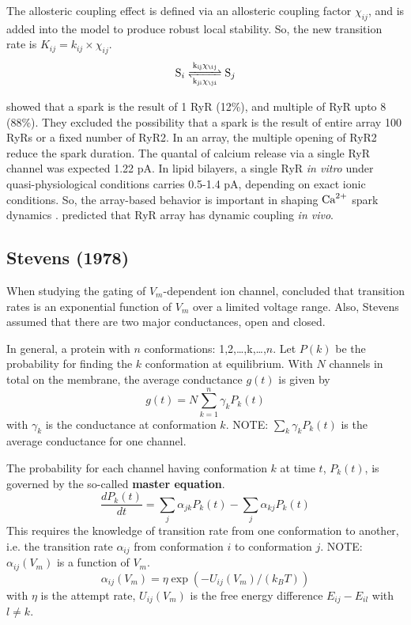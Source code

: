 The allosteric coupling effect is defined via an allosteric coupling
factor $\chi_{ij}$, and is added into the model to produce robust local
stability. So, the new transition rate is $K_{ij}=k_{ij}\times \chi_{ij}$.
\begin{equation}
  \label{eq:1216}
  \ce{S_i <=>[k_{ij}\chi_\ij][k_{ji}\chi_\ji] S_j}
\end{equation}

\citep{wang2004} showed that a spark is the result of 1 RyR (12\%), and multiple
of RyR upto 8 (88\%). They excluded the possibility that a spark is the result
of entire array 100 RyRs or a fixed number of RyR2. In an array, the multiple
opening of RyR2 reduce the spark duration. The quantal of calcium release via a
single RyR channel was expected 1.22 pA. In lipid bilayers, a single RyR {\it in
vitro} under quasi-physiological conditions carries 0.5-1.4 pA, depending on
exact ionic conditions. So, the array-based behavior is
important in shaping ${\text{Ca}^{2+}}$ spark dynamics \citep{wang2004}. \citep{Liang2009}
predicted that RyR array has dynamic coupling {\it in vivo}.

\subsection{Stevens (1978)}

When studying the gating of $V_m$-dependent ion channel, \citep{stevens1978}
concluded that transition rates is an exponential function of $V_m$ over a
limited voltage range. Also, Stevens assumed that there are two major
conductances, open and closed. 

In general, a protein with $n$ conformations: 1,2,\ldots,k,\ldots,$n$. Let
$P(k)$ be the probability for finding the $k$ conformation at equilibrium. With
$N$ channels in total on the membrane, the average conductance $g(t)$ is given
by
\begin{equation}
g(t) = N \sum_{k=1}^n	\gamma_k P_k(t)
\end{equation}
with $\gamma_k$ is the conductance at conformation $k$. NOTE:
$\sum_k\gamma_kP_k(t)$ is the average conductance for one channel. 

The probability for each channel having conformation $k$ at time $t$, $P_k(t)$,
is governed by the so-called {\bf master equation}.
\begin{equation}
\frac{dP_k(t)}{dt} = \sum_j	\alpha_{jk}P_k(t) - \sum_j \alpha_{kj}P_k(t)
\end{equation}
This requires the knowledge of transition rate from one conformation to another,
i.e. the transition rate $\alpha_{ij}$ from conformation $i$ to conformation
$j$. NOTE: $\alpha_{ij}(V_m)$ is a function of $V_m$.
\begin{equation}
\alpha_{ij}(V_m) = \eta \exp\left( -U_{ij}(V_m)/(k_BT) \right)
\end{equation}
with $\eta$ is the attempt rate, $U_{ij}(V_m)$ is the free energy difference
$E_{ij}-E_{il}$ with $l\ne k$.

